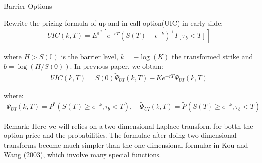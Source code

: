 \documentclass{beamer}
\begin{document}
    
    



\begin{frame}{Barrier Options}

    {\footnotesize \footnotesize
    \par Rewrite the pricing formula of up-and-in call option(UIC) in early silde:
    \begin{align*}
        UIC(k,T) = E^{\mathbb{P}^*} \left[ e^{-rT} \left( S(T) - e^{-k} \right)^+ I{[\tau_b < T]} \right]
    \end{align*}
    \par where \( H > S(0) \) is the barrier level, \( k = -\log(K) \) the transformed strike and \( b = \log(H/S(0)) \). In previous paper, we obtain:
    \begin{align*}
        UIC(k,T) = S(0) \tilde{\Psi}_{UI}(k,T) - Ke^{-rT} \Psi_{UI}(k,T)
    \end{align*}
    \par  \pause  where:
    \begin{align*}
        \Psi_{UI}(k,T) = P^*(S(T) \geq e^{-k},  \tau_b < T), \quad \widetilde{\Psi}_{UI}(k,T) = \widetilde{P}(S(T) \geq e^{-k},  \tau_b < T) 
    \end{align*}
    \par Remark: Here we will relies on a two-dimensional Laplace transform for botth the option price and the probabilities. The formulae after doing two-dimensional 
    transforms become much simpler than the one-dimensional formulae in Kou and Wang (2003), which involve many special functions.
    }
    
\end{frame}
\end{document}
